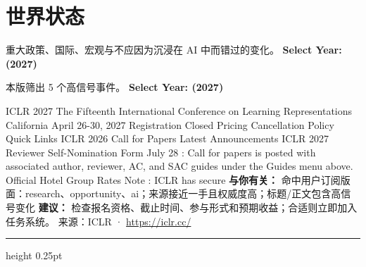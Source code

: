 \documentclass[10.5pt]{ctexart}
\begin{document}
\section*{世界状态}
{\color{ormuted} 重大政策、国际、宏观与不应因为沉浸在 AI 中而错过的变化。}
\vspace{2mm}
{\LARGE\bfseries Select Year: (2027)}\par
\vspace{1mm}
{\color{ormuted} 本版筛出 5 个高信号事件。}
\vspace{3mm}
{\Large\bfseries Select Year: (2027)}\par
ICLR 2027 The Fifteenth International Conference on Learning Representations California April 26-30, 2027 Registration Closed Pricing Cancellation Policy Quick Links ICLR 2026 Call for Papers Latest Announcements ICLR 2027 Reviewer Self-Nomination Form July 28 : Call for papers is posted with associated author, reviewer, AC, and SAC guides under the Guides menu above. Official Hotel Group Rates Note : ICLR has secure
\textbf{与你有关：} 命中用户订阅版面：research、opportunity、ai；来源接近一手且权威度高；标题/正文包含高信号变化
\textbf{建议：} 检查报名资格、截止时间、参与形式和预期收益；合适则立即加入任务系统。
{\footnotesize\color{ormuted} 来源：ICLR · \url{https://iclr.cc/}}
\vspace{4mm}
\hrule height 0.25pt
\vspace{3mm}
\end{document}
